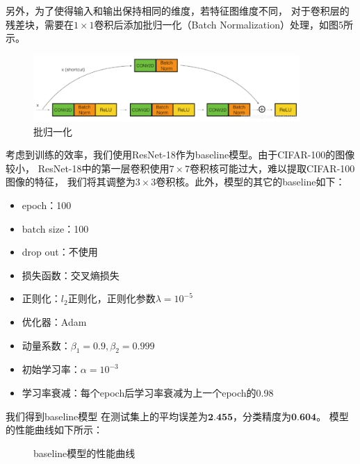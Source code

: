 \documentclass[UTF8]{ctexart}
\begin{document}
另外，为了使得输入和输出保持相同的维度，若特征图维度不同，
对于卷积层的残差块，需要在$1\times1$卷积后添加批归一化（Batch Normalization）处理，如图5所示。

\begin{figure}[htbp]
    \centering
    \includegraphics[width=0.90\textwidth]{../img/1-3.png}
    \caption{批归一化}
\end{figure}

考虑到训练的效率，我们使用ResNet-18作为baseline模型。由于CIFAR-100的图像较小，
ResNet-18中的第一层卷积使用$7\times7$卷积核可能过大，难以提取CIFAR-100图像的特征，
我们将其调整为$3\times3$卷积核。此外，模型的其它的baseline如下：
\begin{itemize}
    \item epoch：100
    \item batch size：100
    \item drop out：不使用
    \item 损失函数：交叉熵损失
    \item 正则化：$l_2$正则化，正则化参数$\lambda=10^{-5}$
    \item 优化器：Adam
    \item 动量系数：$\beta_1=0.9, \beta_2=0.999$
    \item 初始学习率：$\alpha=10^{-3}$
    \item 学习率衰减：每个epoch后学习率衰减为上一个epoch的0.98
\end{itemize}

我们得到baseline模型
在测试集上的平均误差为$\textbf{2.455}$，分类精度为$\textbf{0.604}$。
模型的性能曲线如下所示：

\begin{figure}[htbp]
    \centering
    \hspace{0.5in}
    \caption{baseline模型的性能曲线}
\end{figure}
\end{document}
